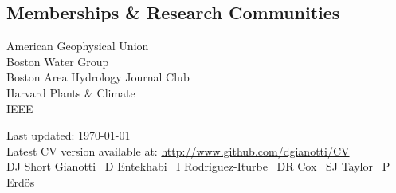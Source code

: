 \documentclass[]{friggeri-cv}
\begin{document}
\subsection{Memberships \& Research Communities}
American Geophysical Union\\ %
Boston Water Group\\ %
Boston Area Hydrology Journal Club\\ %
Harvard Plants \& Climate\\
IEEE

\vfill{}

\begin{flushright}
{\scriptsize  Last updated: \today \\
Latest CV version available at: \href{http://www.github.com/dgianotti/CV}{http://www.github.com/dgianotti/CV}\\
DJ Short Gianotti \rightarrow\ D Entekhabi \rightarrow\ I Rodriguez-Iturbe \rightarrow\ DR Cox \rightarrow\ SJ Taylor \rightarrow\ P Erd\"{o}s}
\end{flushright}
\end{document}
